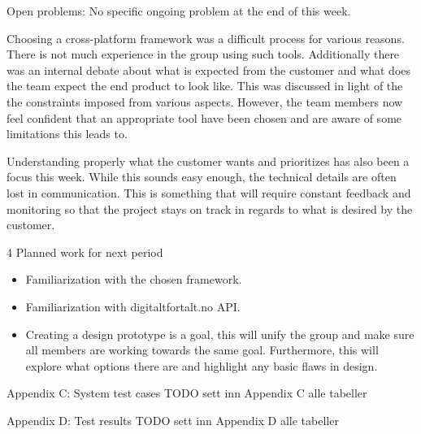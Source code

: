 Open problems:\newline
No specific ongoing problem at the end of this week.\newline

Choosing a cross-platform framework was a difficult process for various reasons. There is not much experience in the group using such tools. Additionally there was an internal debate about what is expected from the customer and what does the team expect the end product to look like. This was discussed in light of the the constraints imposed from various aspects. However, the team members now feel confident that an appropriate tool have been chosen and are aware of some limitations this leads to.\newline

Understanding properly what the customer wants and prioritizes has also been a focus this week. While this sounds easy enough, the technical details are often lost in communication. This is something that will require constant feedback and monitoring so that the project stays on track in regards to what is desired by the customer.\newline

4 Planned work for next period\newline
\begin{itemize}
	\item Familiarization with the chosen framework.
	\item Familiarization with digitaltfortalt.no API.
	\item Creating a design prototype is a goal, this will unify the group and make sure all members are working towards the same goal. Furthermore, this will explore what options there are and highlight any basic flaws in design.\newline
\end{itemize}

Appendix C: System test cases\newline
TODO sett inn Appendix C alle tabeller\newline

Appendix D: Test results \newline
TODO sett inn Appendix D alle tabeller\newline

\cleardoublepage